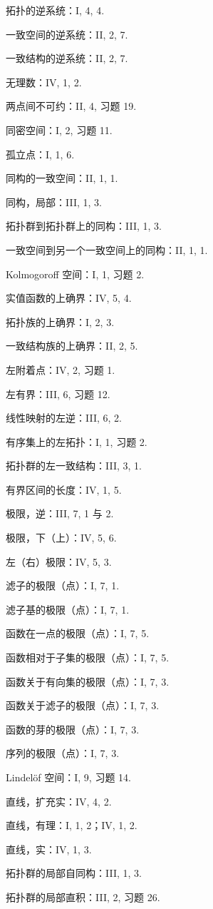拓扑的逆系统：I, 4, 4.

一致空间的逆系统：II, 2, 7.

一致结构的逆系统：II, 2, 7.

无理数：IV, 1, 2.

两点间不可约：II, 4, 习题 19.

同密空间：I, 2, 习题 11.

孤立点：I, 1, 6.

同构的一致空间：II, 1, 1.

同构，局部：III, 1, 3.

拓扑群到拓扑群上的同构：III, 1, 3.

一致空间到另一个一致空间上的同构：II, 1, 1.

Kolmogoroff 空间：I, 1, 习题 2.

实值函数的上确界：IV, 5, 4.

拓扑族的上确界：I, 2, 3.

一致结构族的上确界：II, 2, 5.

左附着点：IV, 2, 习题 1.

左有界：III, 6, 习题 12.

线性映射的左逆：III, 6, 2.

有序集上的左拓扑：I, 1, 习题 2.

拓扑群的左一致结构：III, 3, 1.

有界区间的长度：IV, 1, 5.

极限，逆：III, 7, 1 与 2.

极限，下（上）：IV, 5, 6.

左（右）极限：IV, 5, 3.

滤子的极限（点）：I, 7, 1.

滤子基的极限（点）：I, 7, 1.

函数在一点的极限（点）：I, 7, 5.

函数相对于子集的极限（点）：I, 7, 5.

函数关于有向集的极限（点）：I, 7, 3.

函数关于滤子的极限（点）：I, 7, 3.

函数的芽的极限（点）：I, 7, 3.

序列的极限（点）：I, 7, 3.

Lindelöf 空间：I, 9, 习题 14.

直线，扩充实：IV, 4, 2.

直线，有理：I, 1, 2；IV, 1, 2.

直线，实：IV, 1, 3.

拓扑群的局部自同构：III, 1, 3.

拓扑群的局部直积：III, 2, 习题 26.

